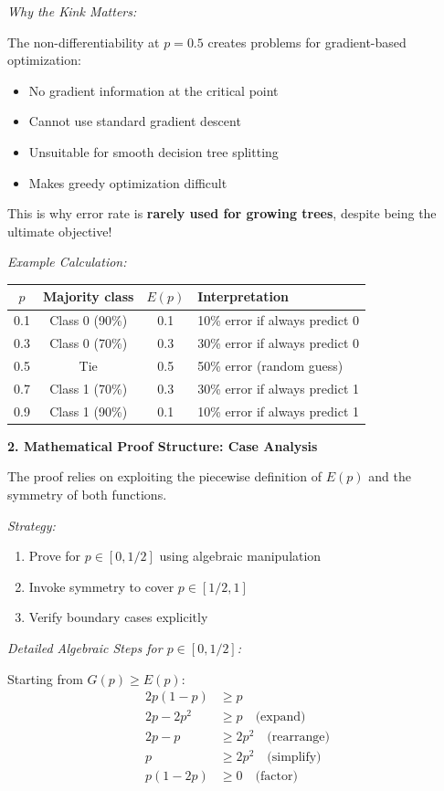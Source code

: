 \documentclass[12pt]{article}
\begin{document}
\begin{explanation}
\textit{Why the Kink Matters:}

The non-differentiability at $p=0.5$ creates problems for gradient-based optimization:
\begin{itemize}
    \item No gradient information at the critical point
    \item Cannot use standard gradient descent
    \item Unsuitable for smooth decision tree splitting
    \item Makes greedy optimization difficult
\end{itemize}

This is why error rate is \textbf{rarely used for growing trees}, despite being the ultimate objective!

\textit{Example Calculation:}

\begin{center}
\begin{tabular}{c|c|c|l}
$p$ & Majority class & $E(p)$ & Interpretation \\
\hline
0.1 & Class 0 (90\%) & 0.1 & 10\% error if always predict 0 \\
0.3 & Class 0 (70\%) & 0.3 & 30\% error if always predict 0 \\
0.5 & Tie & 0.5 & 50\% error (random guess) \\
0.7 & Class 1 (70\%) & 0.3 & 30\% error if always predict 1 \\
0.9 & Class 1 (90\%) & 0.1 & 10\% error if always predict 1 \\
\end{tabular}
\end{center}

\textbf{2. Mathematical Proof Structure: Case Analysis}

The proof relies on exploiting the piecewise definition of $E(p)$ and the symmetry of both functions.

\textit{Strategy:}
\begin{enumerate}
    \item Prove for $p \in [0, 1/2]$ using algebraic manipulation
    \item Invoke symmetry to cover $p \in [1/2, 1]$
    \item Verify boundary cases explicitly
\end{enumerate}

\textit{Detailed Algebraic Steps for $p \in [0, 1/2]$:}

Starting from $G(p) \geq E(p)$:
\begin{align*}
2p(1-p) &\geq p \\
2p - 2p^2 &\geq p \quad \text{(expand)} \\
2p - p &\geq 2p^2 \quad \text{(rearrange)} \\
p &\geq 2p^2 \quad \text{(simplify)} \\
p(1 - 2p) &\geq 0 \quad \text{(factor)}
\end{align*}


\end{explanation}
\end{document}
